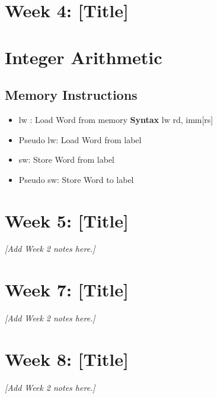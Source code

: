 \documentclass{article}
\begin{document}
\newpage
\section*{Week 4: [Title]}

\section*{Integer Arithmetic}

\subsection{Memory Instructions}
\begin{itemize}
    \item lw : Load Word from memory
        \subitem \textbf{Syntax} lw rd, imm[rs]
    \item Pseudo lw: Load Word from label
    \item sw: Store Word from label
    \item Pseudo sw: Store Word to label
\end{itemize}

\newpage
\section*{Week 5: [Title]}
\textit{[Add Week 2 notes here.]}


\newpage
\section*{Week 7: [Title]}
\textit{[Add Week 2 notes here.]}


\newpage
\section*{Week 8: [Title]}
\textit{[Add Week 2 notes here.]}
\end{document}
